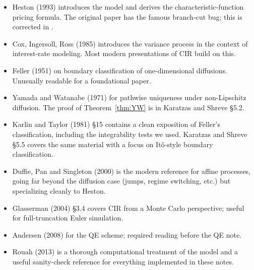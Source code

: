 \documentclass[11pt]{article}
\theoremstyle{plain}
\theoremstyle{definition}
\theoremstyle{remark}
\begin{document}
\begin{itemize}[topsep=2pt]
    \item Heston (1993) \cite{Heston1993} introduces the model and derives the characteristic-function pricing formula. The original paper has the famous branch-cut bug; this is corrected in \cite{AMSS2007}.
    \item Cox, Ingersoll, Ross (1985) \cite{CIR1985} introduces the variance process in the context of interest-rate modeling. Most modern presentations of CIR build on this.
    \item Feller (1951) \cite{Feller1951} on boundary classification of one-dimensional diffusions. Unusually readable for a foundational paper.
    \item Yamada and Watanabe (1971) \cite{YamadaWatanabe1971} for pathwise uniqueness under non-Lipschitz diffusion. The proof of Theorem~\ref{thm:YW} is in Karatzas and Shreve \cite{KaratzasShreve1991} \S5.2.
    \item Karlin and Taylor (1981) \cite{KarlinTaylor1981} \S15 contains a clean exposition of Feller's classification, including the integrability tests we used. Karatzas and Shreve \cite{KaratzasShreve1991} \S5.5 covers the same material with a focus on Itô-style boundary classification.
    \item Duffie, Pan and Singleton (2000) \cite{DPS2000} is the modern reference for affine processes, going far beyond the diffusion case (jumps, regime switching, etc.) but specializing cleanly to Heston.
    \item Glasserman (2004) \cite{Glasserman2004} \S3.4 covers CIR from a Monte Carlo perspective; useful for full-truncation Euler simulation.
    \item Andersen (2008) \cite{Andersen2008} for the QE scheme; required reading before the QE note.
    \item Rouah (2013) \cite{Rouah2013} is a thorough computational treatment of the model and a useful sanity-check reference for everything implemented in these notes.
\end{itemize}
\end{document}
